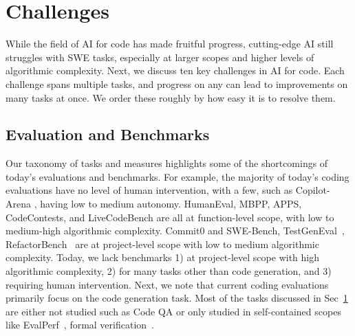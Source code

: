 \vspace{-0.5cm}
\section{Challenges} \label{sec:challenges}
\vspace{-0.2cm}


While the field of AI for code has made fruitful progress, cutting-edge AI still struggles with SWE tasks, especially at larger scopes and higher levels of algorithmic complexity. Next, we discuss ten key challenges in AI for code. Each challenge spans multiple tasks, and progress on any can lead to improvements on many tasks at once. We order these roughly by how easy it is to resolve them.


\vspace{-0.2cm}

\subsection{Evaluation and Benchmarks}

\vspace{-0.1cm}

Our taxonomy of tasks and measures highlights some of the shortcomings of today's evaluations and benchmarks. For example, the majority of today's coding evaluations have no level of human intervention, with a few, such as Copilot-Arena \citep{chi2024copilot}, having low to medium autonomy. 
HumanEval, MBPP, APPS, CodeContests, and LiveCodeBench are all at function-level scope, with low to medium-high algorithmic complexity. Commit0 and SWE-Bench, TestGenEval~\citep{jain2024testgeneval}, RefactorBench~\citep{gautam2024refactorbench} are at project-level scope with low to medium algorithmic complexity. Today, we lack benchmarks 1) at project-level scope with high algorithmic complexity, 2) for many tasks other than code generation, and 3) requiring human intervention. Next, we note that current coding evaluations primarily focus on the code generation task. 
Most of the tasks discussed in Sec~\ref{sec:challenges} are either not studied such as Code QA or only studied in self-contained scopes like EvalPerf~\citep{evalperf}, formal verification~\citep{sun2024clover}.

